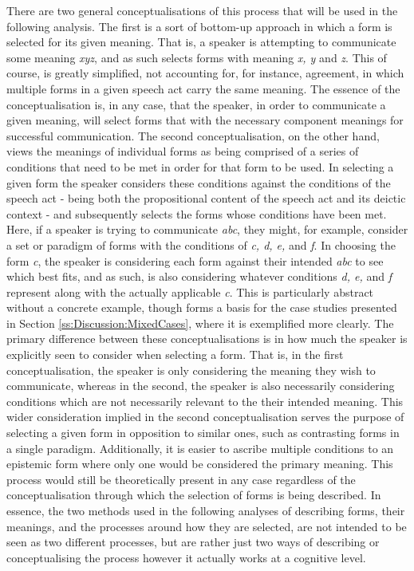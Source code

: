 There are two general conceptualisations of this process that will be used in the following analysis. The first is a sort of bottom-up approach in which a form is selected for its given meaning. That is, a speaker is attempting to communicate some meaning \textit{xyz}, and as such selects forms with meaning \textit{x, y} and \textit{z}. This of course, is greatly simplified, not accounting for, for instance, agreement, in which multiple forms in a given speech act carry the same meaning. The essence of the conceptualisation is, in any case, that the speaker, in order to communicate a given meaning, will select forms that with the necessary component meanings for successful communication. The second conceptualisation, on the other hand, views the meanings of individual forms as being comprised of a series of conditions that need to be met in order for that form to be used. In selecting a given form the speaker considers these conditions against the conditions of the speech act - being both the propositional content of the speech act and its deictic context - and subsequently selects the forms whose conditions have been met. Here, if a speaker is trying to communicate \textit{abc}, they might, for example, consider a set or paradigm of forms with the conditions of \textit{c, d, e,} and \textit{f}. In choosing the form \textit{c}, the speaker is considering each form against their intended \textit{abc} to see which best fits, and as such, is also considering whatever conditions \textit{d, e,} and \textit{f} represent along with the actually applicable \textit{c}. This is particularly abstract without a concrete example, though forms a basis for the case studies presented in Section \ref{ss:Discussion:MixedCases}, where it is exemplified more clearly. The primary difference between these conceptualisations is in how much the speaker is explicitly seen to consider when selecting a form. That is, in the first conceptualisation, the speaker is only considering the meaning they wish to communicate, whereas in the second, the speaker is also necessarily considering conditions which are not necessarily relevant to the their intended meaning. This wider consideration implied in the second conceptualisation serves the purpose of selecting a given form in opposition to similar ones, such as contrasting forms in a single paradigm. Additionally, it is easier to ascribe multiple conditions to an epistemic form where only one would be considered the primary meaning. This process would still be theoretically present in any case regardless of the conceptualisation through which the selection of forms is being described. In essence, the two methods used in the following analyses of describing forms, their meanings, and the processes around how they are selected, are not intended to be seen as two different processes, but are rather just two ways of describing or conceptualising the process however it actually works at a cognitive level.

